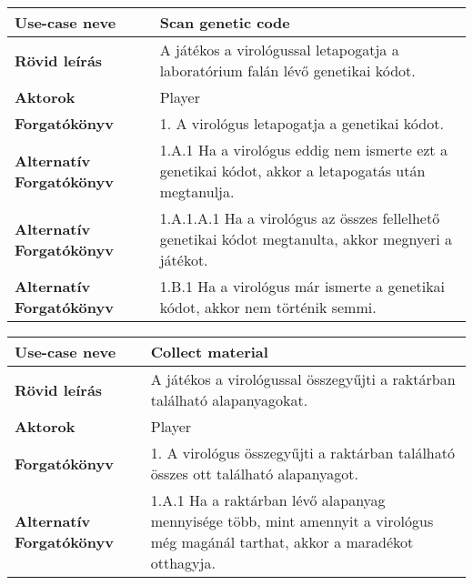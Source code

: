 \noindent\begin{tabularx}{\textwidth}{|l|X|}
	\hline
	\textbf{Use-case neve}           & \textbf{Scan genetic code}                                                                          \\
	\hline
	\hline
	\textbf{Rövid leírás}            & A játékos a virológussal letapogatja a laboratórium falán lévő genetikai kódot.                     \\
	\hline
	\textbf{Aktorok}                 & Player                                                                                              \\
	\hline
	\textbf{Forgatókönyv}            & 1. A virológus letapogatja a genetikai kódot.                                                       \\
	\hline
	\textbf{Alternatív Forgatókönyv} & 1.A.1 Ha a virológus eddig nem ismerte ezt a genetikai kódot, akkor a letapogatás után megtanulja.  \\
	\hline
	\textbf{Alternatív Forgatókönyv} & 1.A.1.A.1 Ha a virológus az összes fellelhető genetikai kódot megtanulta, akkor megnyeri a játékot. \\
	\hline
	\textbf{Alternatív Forgatókönyv} & 1.B.1 Ha a virológus már ismerte a genetikai kódot, akkor nem történik semmi.                       \\
	\hline
\end{tabularx}

\bigskip

\noindent\begin{tabularx}{\textwidth}{|l|X|}
	\hline
	\textbf{Use-case neve}           & \textbf{Collect material}                                                                                                        \\
	\hline
	\hline
	\textbf{Rövid leírás}            & A játékos a virológussal összegyűjti a raktárban található alapanyagokat.                                                        \\
	\hline
	\textbf{Aktorok}                 & Player                                                                                                                           \\
	\hline
	\textbf{Forgatókönyv}            & 1. A virológus összegyűjti a raktárban található összes ott található alapanyagot.                                               \\
	\hline
	\textbf{Alternatív Forgatókönyv} & 1.A.1 Ha a raktárban lévő alapanyag mennyisége több, mint amennyit a virológus még magánál tarthat, akkor a maradékot otthagyja. \\
	\hline
\end{tabularx}

